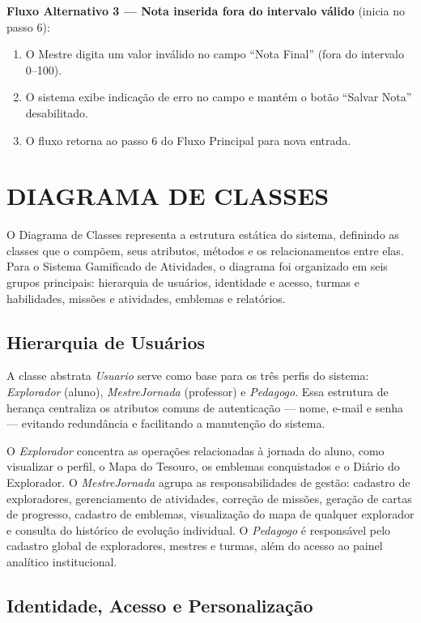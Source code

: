 \documentclass[12pt, a4paper]{article}
\begin{document}
\textbf{Fluxo Alternativo 3 --- Nota inserida fora do intervalo válido} (inicia no passo 6):
\begin{enumerate}
    \item O Mestre digita um valor inválido no campo ``Nota Final'' (fora do intervalo 0--100).
    \item O sistema exibe indicação de erro no campo e mantém o botão ``Salvar Nota'' desabilitado.
    \item O fluxo retorna ao passo 6 do Fluxo Principal para nova entrada.
\end{enumerate}


\section{DIAGRAMA DE CLASSES}

O Diagrama de Classes representa a estrutura estática do sistema,
definindo as classes que o compõem, seus atributos, métodos e os
relacionamentos entre elas. Para o Sistema Gamificado de Atividades,
o diagrama foi organizado em seis grupos principais: hierarquia de
usuários, identidade e acesso, turmas e habilidades, missões e
atividades, emblemas e relatórios.

\subsection{Hierarquia de Usuários}

A classe abstrata \textit{Usuario} serve como base para os três
perfis do sistema: \textit{Explorador} (aluno),
\textit{MestreJornada} (professor) e \textit{Pedagogo}. Essa
estrutura de herança centraliza os atributos comuns de autenticação
— nome, e-mail e senha — evitando redundância e facilitando a
manutenção do sistema.

O \textit{Explorador} concentra as operações relacionadas à jornada
do aluno, como visualizar o perfil, o Mapa do Tesouro, os emblemas
conquistados e o Diário do Explorador. O \textit{MestreJornada}
agrupa as responsabilidades de gestão: cadastro de exploradores,
gerenciamento de atividades, correção de missões, geração de cartas
de progresso, cadastro de emblemas, visualização do mapa de qualquer
explorador e consulta do histórico de evolução individual. O
\textit{Pedagogo} é responsável pelo cadastro global de exploradores,
mestres e turmas, além do acesso ao painel analítico institucional.

\subsection{Identidade, Acesso e Personalização}
\end{document}
